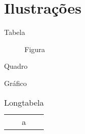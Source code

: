 \section{Ilustrações}

\begin{table}
\caption{Tabela}
\end{table}

\begin{figure}
\caption{Figura}
\end{figure}

\begin{quadro}
\caption{Quadro}
\end{quadro}

\begin{grafico}
\caption{Gráfico}
\end{grafico}

\begin{longtable}{c}
\caption{Longtabela}
\endfirsthead
\endhead
\endfoot
\endlastfoot
a
\end{longtable}



\begin{lstlisting}[caption = código]

\end{lstlisting}